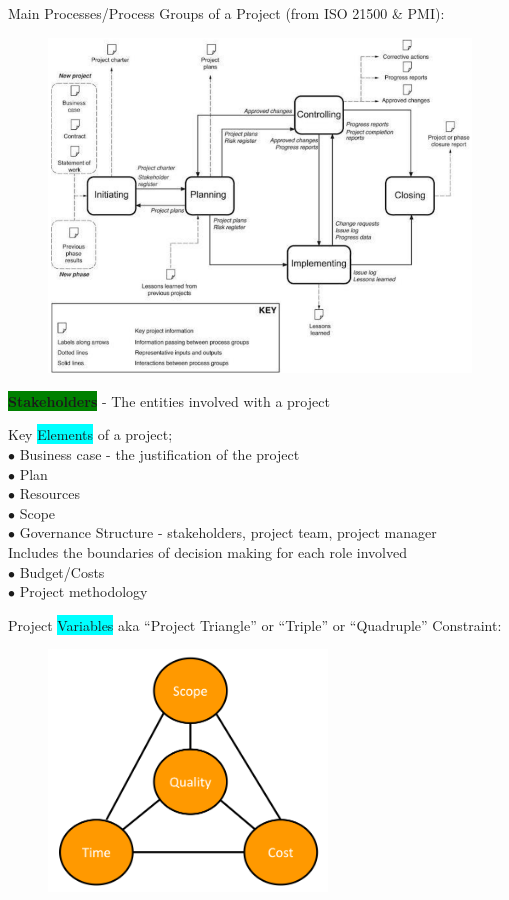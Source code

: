 \documentclass[]{project_plan}
\newcommand{\bulletPoint}{\hspace{-3.1pt}$\bullet$ \hspace{5pt}}
\begin{document}
Main Processes/Process Groups of a Project (from ISO 21500 \& PMI):
\begin{figure}[h!]
  \centering
  \includegraphics[width=\linewidth]{key_project_process_groups.png}
\end{figure}


\colorbox{green}{\textbf{Stakeholders}} - The entities involved with a project

Key \colorbox{cyan}{Elements} of a project;\\
\bulletPoint Business case - the justification of the project\\
\bulletPoint Plan\\
\bulletPoint Resources\\
\bulletPoint Scope\\
\bulletPoint Governance Structure - stakeholders, project team, project manager\\
Includes the boundaries of decision making for each role involved\\
\bulletPoint Budget/Costs\\
\bulletPoint Project methodology

\newpage

Project \colorbox{cyan}{Variables} aka “Project Triangle” or “Triple” or “Quadruple” Constraint:
\begin{figure}[h!]
  \centering
  \includegraphics[width=20em]{project_variables_triangle.png}
\end{figure}
\end{document}
